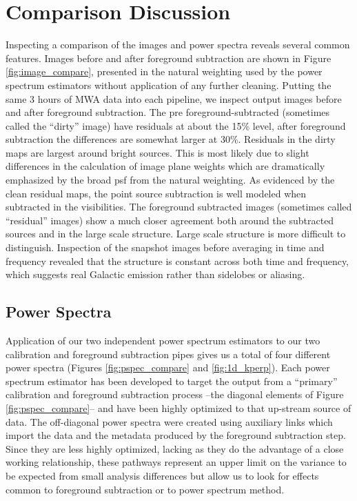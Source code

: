 \documentclass[twolcolumn,iop]{emulateapj}
\begin{document}
\section{Comparison Discussion}
\label{sec:results}

Inspecting a comparison of the images and power spectra reveals several common features. Images before and after foreground subtraction are shown in Figure \ref{fig:image_compare}, presented in the natural weighting used by the power spectrum estimators without application of any further cleaning.  Putting the same 3 hours of MWA data into each pipeline, we inspect output images before and after foreground subtraction. The pre foreground-subtracted (sometimes called the ``dirty'' image) have residuals at about the 15\% level, after foreground subtraction the differences are somewhat larger at 30\%. Residuals in the dirty maps are largest  around bright sources. This is most likely due to slight differences in the calculation of image plane weights which are dramatically emphasized by the broad psf from the natural weighting. As evidenced by the clean residual maps, the point source subtraction is well modeled when subtracted in the visibilities.  The foreground subtracted images (sometimes called ``residual'' images) show a much closer agreement both around the subtracted sources and in the large scale structure. Large scale structure is more difficult to distinguish. Inspection of the snapshot images before averaging in time and frequency revealed that the structure is constant across both time and frequency, which suggests real Galactic emission rather than sidelobes or aliasing.  



\subsection{Power Spectra}
\label{sec:power_spectrum_comparison}
Application of our two independent power spectrum estimators to our two calibration and foreground subtraction pipes gives us a total of four different power spectra (Figures \ref{fig:pspec_compare} and \ref{fig:1d_kperp}).  Each power spectrum estimator has been developed to target the output from a ``primary'' calibration and foreground subtraction process --the diagonal elements of Figure \ref{fig:pspec_compare}-- and have been highly optimized to that up-stream source of data.  The off-diagonal power spectra were created using auxiliary links which import the data and the metadata produced by the foreground subtraction step.  Since they are less highly optimized, lacking as they do the advantage of a close working relationship, these pathways represent an upper limit on the variance to be expected from small analysis differences but allow us to look for effects common to foreground subtraction or to power spectrum method.
\end{document}
